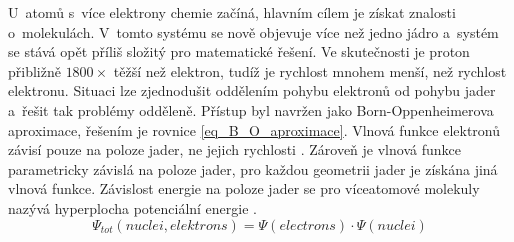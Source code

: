 \documentclass[
  printed, %
  table,   %
  lof,     %
  lot,     %
  oneside,
]{fithesis3}
\begin{document}
U~atomů s~více  elektrony chemie začíná, hlavním cílem je získat znalosti o~molekulách. V~tomto systému se nově objevuje více než jedno jádro a~systém se stává opět příliš složitý pro matematické řešení. Ve skutečnosti je proton přibližně $1800 \times$ těžší než elektron, tudíž je rychlost mnohem menší, než rychlost elektronu. Situaci lze zjednodušit oddělením pohybu elektronů od pohybu jader a~řešit tak problémy odděleně. Přístup byl navržen jako Born-Oppenheimerova aproximace, řešením je rovnice \ref{eq_B_O_aproximace}. Vlnová funkce elektronů závisí pouze na poloze jader, ne jejich rychlosti \cite{lechamolecularmodeling}. Zároveň je vlnová funkce parametricky závislá na poloze jader, pro každou geometrii jader je získána jiná vlnová funkce. Závislost energie na poloze jader se pro víceatomové molekuly nazývá hyperplocha potenciální energie \cite{dftshrnutivysledky}.
\begin{equation}
\Psi_{tot}(nuclei, elektrons) = \Psi(electrons) \cdot \Psi(nuclei)
\label{eq_B_O_aproximace} 
\end{equation}
\end{document}
